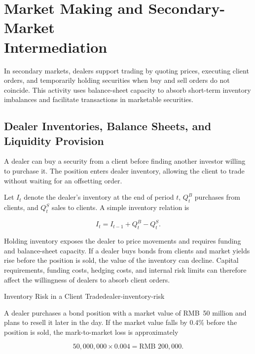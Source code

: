 \section[Market Making and Secondary-Market Intermediation]{Market Making and Secondary-Market \\Intermediation}

In secondary markets, dealers support trading by quoting prices, executing client orders, and temporarily holding securities when buy and sell orders do not coincide. This activity uses balance-sheet capacity to absorb short-term inventory imbalances and facilitate transactions in marketable securities.

\subsection{Dealer Inventories, Balance Sheets, and Liquidity Provision}

A dealer can buy a security from a client before finding another investor willing to purchase it. The position enters dealer inventory, allowing the client to trade without waiting for an offsetting order.

Let $I_t$ denote the dealer's inventory at the end of period $t$, $Q_t^{B}$ purchases from clients, and $Q_t^{S}$ sales to clients. A simple inventory relation is

\begin{equation}
I_t=I_{t-1}+Q_t^{B}-Q_t^{S}.
\label{eq:ch13-dealer-inventory}
\end{equation}

Holding inventory exposes the dealer to price movements and requires funding and balance-sheet capacity. If a dealer buys bonds from clients and market yields rise before the position is sold, the value of the inventory can decline. Capital requirements, funding costs, hedging costs, and internal risk limits can therefore affect the willingness of dealers to absorb client orders.

\begin{example}{Inventory Risk in a Client Trade}{dealer-inventory-risk}

A dealer purchases a bond position with a market value of RMB~50 million and plans to resell it later in the day. If the market value falls by 0.4\%  before the position is sold, the mark-to-market loss is approximately

\[
50{,}000{,}000\times 0.004=\text{RMB }200{,}000.
\]

\end{example}

